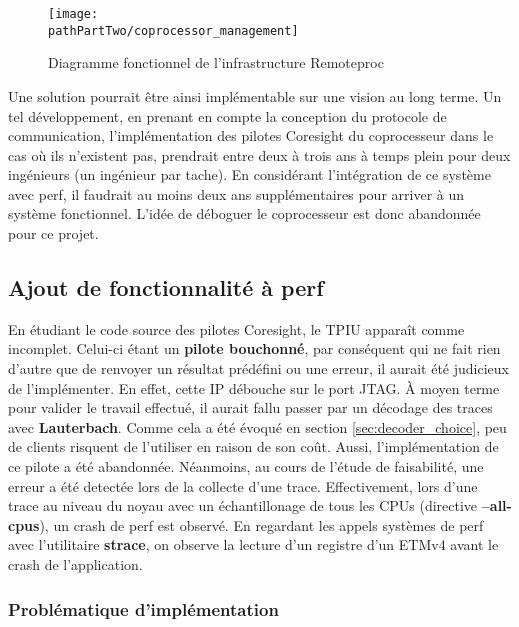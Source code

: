 \begin{figure}[H]
	\begin{center}
		\texttt{[image: \\pathPartTwo/coprocessor\_management]}
		\caption{Diagramme fonctionnel de l'infrastructure Remoteproc}
	    \label{fig:coprocessor_management}
	\end{center}
\end{figure}

Une solution pourrait être ainsi implémentable sur une vision au long terme.
Un tel développement, en prenant en compte la conception du protocole de
communication, l'implémentation des pilotes Coresight du coprocesseur dans le
cas où ils n'existent pas, prendrait entre deux à trois ans à temps plein pour
deux ingénieurs (un ingénieur par tache). En considérant l'intégration de ce
système avec perf, il faudrait au moins deux ans supplémentaires pour arriver
à un système fonctionnel. L'idée de déboguer le coprocesseur est donc
abandonnée pour ce projet.

\subsection{Ajout de fonctionnalité à perf}
\label{sec:add_perf_feature}

En étudiant le code source des pilotes Coresight, le TPIU apparaît comme
incomplet. Celui-ci étant un \textbf{pilote bouchonné}, par conséquent qui ne
fait rien d'autre que de renvoyer un résultat prédéfini ou une erreur, il
aurait été judicieux de l'implémenter. En effet, cette IP débouche sur le port
JTAG. À moyen terme pour valider le travail effectué, il aurait fallu passer
par un décodage des traces avec \textbf{Lauterbach}. Comme cela a été évoqué
en section \ref{sec:decoder_choice}, peu de clients risquent de l'utiliser en
raison de son coût. Aussi, l'implémentation de ce pilote a été abandonnée.
Néanmoins, au cours de l'étude de faisabilité, une erreur a été detectée lors
de la collecte d'une trace. Effectivement, lors d'une trace au niveau du noyau
avec un échantillonage de tous les CPUs (directive \textbf{--all-cpus}), un
crash de perf est observé.  En regardant les appels systèmes de perf avec
l'utilitaire \textbf{strace}, on observe la lecture d'un registre d'un ETMv4
avant le crash de l'application.

\subsubsection{Problématique d'implémentation}
\label{sec:problem_implementation}

